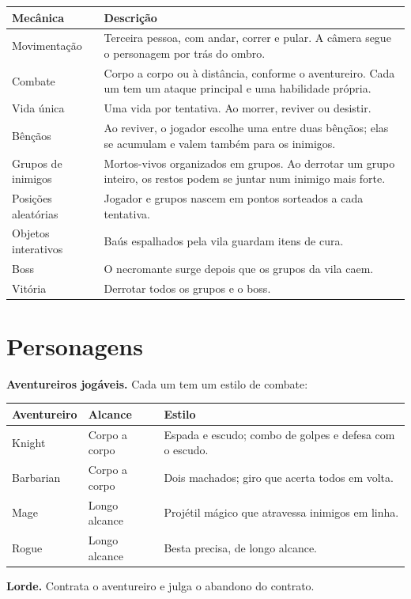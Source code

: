 \documentclass[11pt,a4paper]{article}
\begin{document}
\begin{tabularx}{\textwidth}{@{}lX@{}}
\toprule
\textbf{Mecânica} & \textbf{Descrição} \\
\midrule
Movimentação & Terceira pessoa, com andar, correr e pular. A câmera segue o personagem por trás do ombro. \\
Combate & Corpo a corpo ou à distância, conforme o aventureiro. Cada um tem um ataque principal e uma habilidade própria. \\
Vida única & Uma vida por tentativa. Ao morrer, reviver ou desistir. \\
Bênçãos & Ao reviver, o jogador escolhe uma entre duas bênçãos; elas se acumulam e valem também para os inimigos. \\
Grupos de inimigos & Mortos-vivos organizados em grupos. Ao derrotar um grupo inteiro, os restos podem se juntar num inimigo mais forte. \\
Posições aleatórias & Jogador e grupos nascem em pontos sorteados a cada tentativa. \\
Objetos interativos & Baús espalhados pela vila guardam itens de cura. \\
Boss & O necromante surge depois que os grupos da vila caem. \\
Vitória & Derrotar todos os grupos e o boss. \\
\bottomrule
\end{tabularx}

\section{Personagens}

\textbf{Aventureiros jogáveis.} Cada um tem um estilo de combate:

\begin{tabularx}{\textwidth}{@{}llX@{}}
\toprule
\textbf{Aventureiro} & \textbf{Alcance} & \textbf{Estilo} \\
\midrule
Knight & Corpo a corpo & Espada e escudo; combo de golpes e defesa com o escudo. \\
Barbarian & Corpo a corpo & Dois machados; giro que acerta todos em volta. \\
Mage & Longo alcance & Projétil mágico que atravessa inimigos em linha. \\
Rogue & Longo alcance & Besta precisa, de longo alcance. \\
\bottomrule
\end{tabularx}

\textbf{Lorde.} Contrata o aventureiro e julga o abandono do contrato.
\end{document}
